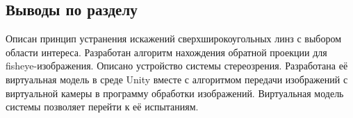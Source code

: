 \subsection{Выводы по разделу}

Описан принцип устранения искажений сверхширокоугольных линз с выбором области интереса. Разработан алгоритм нахождения обратной 
проекции для fisheye-изображения. Описано устройство системы стереозрения. Разработана её виртуальная модель в среде Unity вместе с 
алгоритмом передачи изображений с виртуальной камеры в программу обработки изображений.  
Виртуальная модель системы позволяет перейти к её испытаниям.
